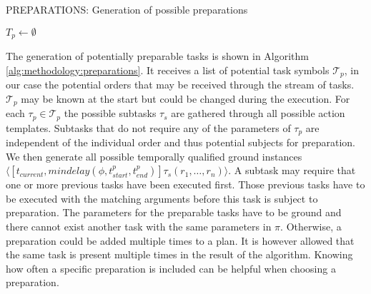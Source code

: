 \begin{algorithm}[t]
    \caption{PREPARATIONS: Generation of possible preparations}
    \label{alg:methodology:preparations}
    $T_p \leftarrow \emptyset$\;
\end{algorithm}

The generation of potentially preparable tasks is shown in Algorithm \ref{alg:methodology:preparations}.
It receives a list of potential task symbols $\mathcal{T}_p$, in our case the potential orders that may be received through the stream of tasks.
$\mathcal{T}_p$ may be known at the start but could be changed during the execution.
For each $\tau_p \in \mathcal{T}_p$ the possible subtasks $\tau_s$ are gathered through all possible action templates.
Subtasks that do not require any of the parameters of $\tau_p$ are independent of the individual order and thus potential subjects for preparation.
We then generate all possible temporally qualified ground instances $\langle[t_{current}, mindelay(\phi,t^p_{start}, t^p_{end})] \tau_s(r_1,\dots,r_n) \rangle$.
A subtask may require that one or more previous tasks have been executed first.
Those previous tasks have to be executed with the matching arguments before this task is subject to preparation.
The parameters for the preparable tasks have to be ground and there cannot exist another task with the same parameters in $\pi$.
Otherwise, a preparation could be added multiple times to a plan.
It is however allowed that the same task is present multiple times in the result of the algorithm.
Knowing how often a specific preparation is included can be helpful when choosing a preparation.


